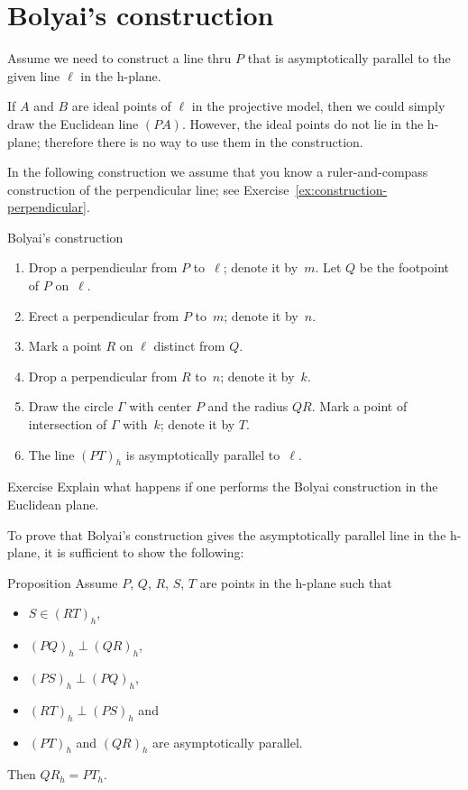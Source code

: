 \section{Bolyai's construction}

Assume we need to construct a line thru $P$ that is asymptotically parallel to the given line $\ell$ in the h-plane.

If $A$ and $B$ are ideal points of $\ell$ in the projective model, 
then we could simply draw the Euclidean line $(PA)$.
However, the ideal points do not lie in the h-plane; therefore there is no way to use them in the construction.

In the following construction we assume that you know a ruler-and-compass construction of the perpendicular line; see Exercise~\ref{ex:construction-perpendicular}.

\begin{thm}{Bolyai's construction}
\begin{enumerate}
\item Drop a perpendicular from $P$ to~$\ell$; denote it by~$m$.
Let $Q$ be the footpoint of $P$ on~$\ell$.
\item Erect a perpendicular from $P$ to~$m$; denote it by~$n$.
\item Mark a point $R$ on $\ell$ distinct from $Q$.
\item Drop a perpendicular from $R$ to~$n$; denote it by~$k$. 
\item Draw the circle $\Gamma$ with center $P$ and the radius $QR$. 
Mark a point of intersection of $\Gamma$ with~$k$; denote it by $T$.
\item The line $(PT)_h$ is asymptotically parallel to~$\ell$.
\end{enumerate}
\end{thm}

\begin{thm}{Exercise}\label{ex:Boyai-in-Euclid}
Explain what happens if one performs the Bolyai construction in the Euclidean plane.
\end{thm}

To prove that Bolyai's construction gives the asymptotically parallel line in the h-plane,
it is sufficient to show the following:

\begin{thm}{Proposition}\label{prop:boyai}
Assume $P$, $Q$, $R$, $S$, $T$ are points in the h-plane
such that 
\begin{itemize}
\item $S\in (RT)_h$,
\item $(PQ)_h\perp (QR)_h$,
\item $(PS)_h\perp(PQ)_h$,
\item $(RT)_h\perp (PS)_h$ and 
\item $(PT)_h$ and $(QR)_h$ are asymptotically parallel.
\end{itemize}
Then $QR_h=PT_h$.
\end{thm}


